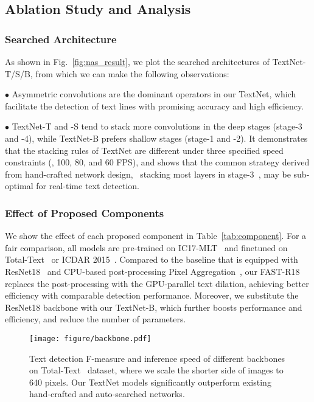 \documentclass[lettersize,journal]{IEEEtran}
\begin{document}
\subsection{Ablation Study and Analysis} 

\subsubsection{Searched Architecture}
As shown in Fig.~\ref{fig:nas_result}, we plot the searched architectures of TextNet-T/S/B, 
from which we can make the following observations:

$\bullet$   Asymmetric convolutions are the dominant operators in our TextNet, which facilitate the detection of text lines with promising accuracy and high efficiency.


$\bullet$   TextNet-T and -S tend to stack more convolutions in the deep stages (stage-3 and -4), while TextNet-B prefers shallow stages (stage-1 and -2). 
It demonstrates that the stacking rules of TextNet are different under three specified speed constraints (\ie, 100, 80, and 60 FPS),
and shows that the common strategy derived from hand-crafted network design, \ie\ stacking most layers in stage-3~\cite{he2016deep,wang2021pvtv2,wang2022internimage}, may be sub-optimal for real-time text detection.

\subsubsection{Effect of Proposed Components}
We show the effect of each proposed component in Table~\ref{tab:component}. 
For a fair comparison, all models are pre-trained on IC17-MLT~\cite{nayef2017icdar2017} and finetuned on Total-Text~\cite{ch2017total} or ICDAR 2015~\cite{karatzas2015icdar}.
Compared to the baseline that is equipped with ResNet18~\cite{he2016deep} and CPU-based post-processing Pixel Aggregation~\cite{wang2019efficient}, our FAST-R18 replaces the post-processing with the GPU-parallel text dilation, achieving better efficiency with comparable detection performance.  
Moreover, we substitute the ResNet18 backbone with our TextNet-B, which further boosts performance and efficiency, and reduce the number of parameters.



\begin{figure}[t]
\texttt{[image: figure/backbone.pdf]}
    \caption{
    Text detection F-measure and inference speed of different backbones on Total-Text~\cite{ch2017total} dataset, where we scale the shorter side of images to 640 pixels.
    Our TextNet models significantly outperform existing hand-crafted and auto-searched networks.
    }
\label{fig:backbone}
\end{figure}
\end{document}

